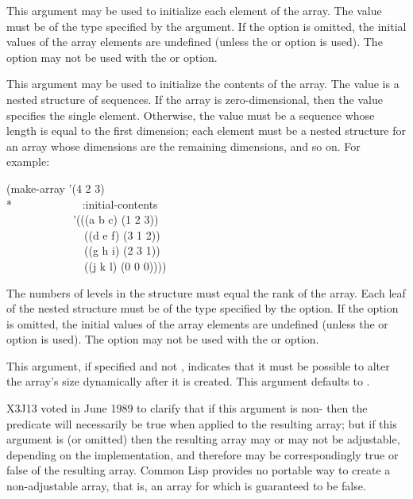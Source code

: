 \begin{defun}[Function]
\begin{flushdesc}
\item[\cd{:initial-element}]
This argument
may be used to initialize each element of the array.  The value
must be of the type specified by the  argument.  If the
 option is omitted, the initial values of the array
elements are undefined (unless the  or
 option is used).
The  option may not be used with the
 or  option.

\item[\cd{:initial-contents}]
This argument may be used to initialize the
contents of the array.  The value is a nested structure of sequences.  If
the array is zero-dimensional, then the value specifies the single
element.  Otherwise, the value must be a sequence whose length is equal
to the first dimension; each element must be a nested structure for an
array whose dimensions are the remaining dimensions, and so on.
For example:
\begin{lisp}
(make-array '(4 2 3) \\*
~~~~~~~~~~~~:initial-contents \\
~~~~~~~~~~~~'(((a b c) (1 2 3)) \\
~~~~~~~~~~~~~~((d e f) (3 1 2)) \\
~~~~~~~~~~~~~~((g h i) (2 3 1)) \\
~~~~~~~~~~~~~~((j k l) (0 0 0))))
\end{lisp}
The numbers of levels in the structure must equal the rank of the array.
Each leaf of the nested structure
must be of the type specified by the  option.  If the
 option is omitted, the initial values of the array
elements are undefined (unless the  or
 option is used).
The  option may not be used with the
 or  option.

\item[\cd{:adjustable}]
This argument, if specified and not {\false}, indicates that it
must be possible to alter the array's size dynamically after it is
created.  This argument defaults to {\nil}.

\begin{newer}
X3J13 voted in June 1989
to clarify that if this argument is non-{\false}
then the predicate  will necessarily be true when applied
to the resulting array; but if this argument is  (or omitted) then the
resulting array may or may not be adjustable, depending on the implementation,
and therefore  may be correspondingly true or false of
the resulting array.  Common Lisp provides no portable way to create a
non-adjustable array, that is, an array for which  is
guaranteed to be false.
\end{newer}


\end{flushdesc}
\end{defun}
